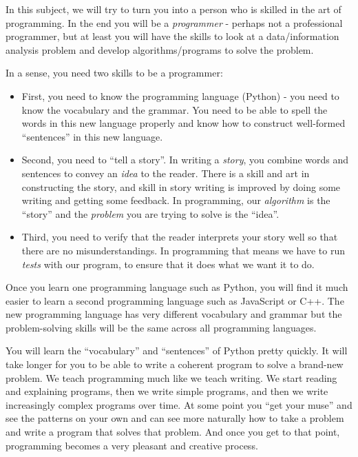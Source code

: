 In this subject, we will try to turn you into a person who is skilled in the art of programming. In the end you will be a \emph{programmer} - perhaps not a professional programmer, but at least you will have the skills to look at a data/information analysis problem and develop algorithms/programs to solve the problem.


In a sense, you need two skills to be a programmer:

\begin{itemize}[nosep]
\item
  First, you need to know the programming language (Python) - you need to know the vocabulary and the grammar. You need to be able to spell the words in this new language properly and know how to construct well-formed ``sentences'' in this new language.
\item
  Second, you need to ``tell a story''. In writing a \emph{story}, you combine words and sentences to convey an \emph{idea} to the reader. There is a skill and art in constructing the story, and skill in story writing is improved by doing some writing and getting some feedback. In programming, our \emph{algorithm} is the ``story'' and the \emph{problem} you are trying to solve is the ``idea''.
\item
  Third, you need to verify that the reader interprets your story well so that there are no misunderstandings. In programming that means we have to run {\em tests} with our program, to ensure that it does what we want it to do.
\end{itemize}

Once you learn one programming language such as Python, you will find it much easier to learn a second programming language such as JavaScript or C++. The new programming language has very different vocabulary and grammar but the problem-solving skills will be the same across all programming languages.

You will learn the ``vocabulary'' and ``sentences'' of Python pretty quickly. It will take longer for you to be able to write a coherent program to solve a brand-new problem. We teach programming much like we teach writing. We start reading and explaining programs, then we write simple programs, and then we write increasingly complex programs over time. At some point you ``get your muse'' and see the patterns on your own and can see more naturally how to take a problem and write a program that solves that problem. And once you get to that point, programming becomes a very pleasant and creative process.

